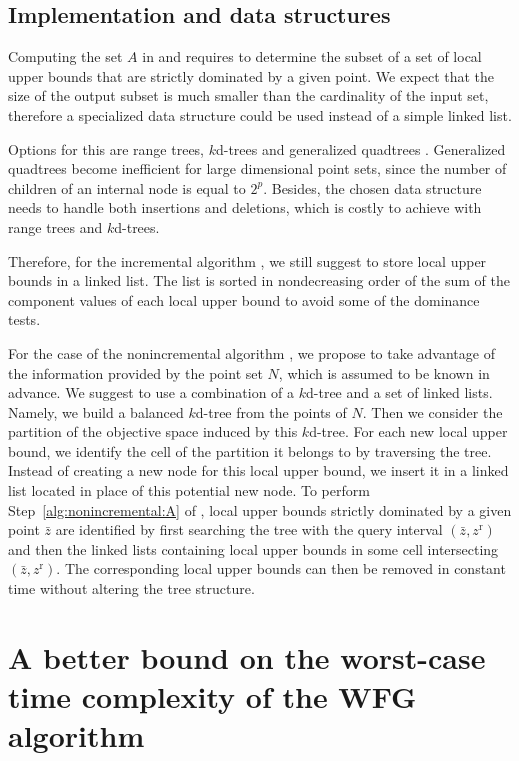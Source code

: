 \documentclass[a4paper,11pt]{article}
\newcommand{\bz}{\bar{z}}
\newcommand{\BM}{z^{\text{r}}}
\begin{document}
\subsection{Implementation and data structures}\label{sub:impl}

Computing the set $A$ in {\UBSI} and {\UBSNI}
requires to determine the subset of a set of local upper bounds that are strictly
dominated by a given point.
We expect that the size of the output subset is much smaller than the cardinality
of the input set, therefore a specialized data structure could be used instead of a simple linked list.

Options for this are range trees, $k$d-trees and generalized quadtrees \citep{deBChevanOve08}.
Generalized quadtrees become inefficient for large dimensional point sets, since the number
of children of an internal node is equal to $2^p$.
Besides, the chosen data structure needs to handle both insertions and deletions,
which is costly to achieve with range trees and $k$d-trees.

Therefore, for the incremental algorithm {\UBSI}, we still suggest 
to store local upper bounds in a linked list. 
The list is sorted in nondecreasing order of the sum of the component values 
of each local upper bound to avoid some of the dominance tests.

For the case of the nonincremental algorithm {\UBSNI},
we propose to take advantage of the information provided 
by the point set $N$, which is assumed to be known in advance.
We suggest to use a combination of a $k$d-tree and a set of linked lists.
Namely, we build a balanced $k$d-tree from the points of $N$.
Then we consider the partition of the objective space induced by this $k$d-tree.
For each new local upper bound, we identify the cell of the partition it belongs to
by traversing the tree. Instead of creating a new node for this local upper bound,
we insert it in a linked list located in place of this potential new node.
To perform Step~\ref{alg:nonincremental:A} of {\UBSNI},
local upper bounds strictly dominated by a given point $\bz$
are identified by first searching the tree with the query interval 
$(\bz, \BM)$ and then the linked lists containing local upper bounds 
in some cell intersecting $(\bz, \BM)$. 
The corresponding local upper bounds can then be removed in constant time 
without altering the tree structure.



\section{A better bound on the worst-case time complexity of the WFG algorithm}\label{sec:wfg-complexity}
\end{document}
